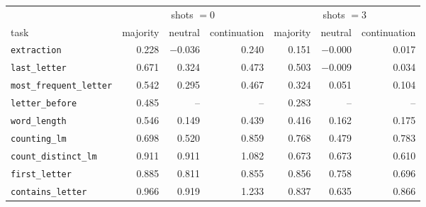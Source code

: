 \begin{tabular}{@{}lrrrrrr@{}}
\toprule
 & \multicolumn{3}{c}{shots $=0$} & \multicolumn{3}{c}{shots $=3$} \\
\cmidrule(lr){2-4}\cmidrule(l){5-7}
task & majority & neutral & continuation & majority & neutral & continuation \\
\midrule
\texttt{extraction} & 0.228 & $-$0.036 & 0.240 & 0.151 & $-$0.000 & 0.017 \\
\texttt{last\_letter} & 0.671 & 0.324 & 0.473 & 0.503 & $-$0.009 & 0.034 \\
\texttt{most\_frequent\_letter} & 0.542 & 0.295 & 0.467 & 0.324 & 0.051 & 0.104 \\
\texttt{letter\_before} & 0.485 & -- & -- & 0.283 & -- & -- \\
\texttt{word\_length} & 0.546 & 0.149 & 0.439 & 0.416 & 0.162 & 0.175 \\
\texttt{counting\_lm} & 0.698 & 0.520 & 0.859 & 0.768 & 0.479 & 0.783 \\
\texttt{count\_distinct\_lm} & 0.911 & 0.911 & 1.082 & 0.673 & 0.673 & 0.610 \\
\texttt{first\_letter} & 0.885 & 0.811 & 0.855 & 0.856 & 0.758 & 0.696 \\
\texttt{contains\_letter} & 0.966 & 0.919 & 1.233 & 0.837 & 0.635 & 0.866 \\
\bottomrule
\end{tabular}